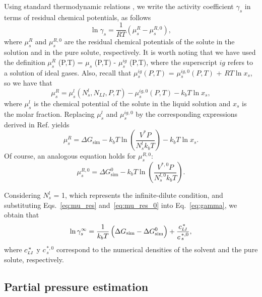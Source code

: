 \documentclass[3p,twocolumn]{elsarticle}
\begin{document}
Using standard thermodynamic relations \cite{Tester}, we write the activity coefficient $\gamma_s$ in terms of residual chemical potentials, as follows
\begin{equation}
\label{eq:gamma}
\ln \gamma_s = \frac{1}{RT} (\mu_s^R - \mu_s^{R,0}),
\end{equation}
where $\mu_s^R$ and $\mu_s^{R,0}$ are the residual chemical potentials of the solute in the solution and in the pure solute, respectively. It is worth noting that we have used the definition $\mu_s^{R}$ (P,T) = $\mu_s$ (P,T) - $\mu_s^{ig}$ (P,T), where the superscript $ig$ refers to a solution of ideal gases. Also, recall that $\mu_s^{ig} (P,T)$ = $\mu_s^{ig,0} (P,T)$ + $RT \ln x_s$, so we have that
\begin{equation}
\mu_s^R = \mu_s^l(N_s^l,N_{LI},P,T) - \mu_s^{ig,0}(P,T) - k_b T \ln x_s, 
\end{equation}
where $\mu_s^l$ is the chemical potential of the solute in the liquid solution and $x_s$ is the molar fraction. Replacing $\mu_s^{l}$ and $\mu_s^{ig,0}$ by the corresponding expressions derived in Ref. \cite{Shirts_2003} yields
\begin{equation}
\label{eq:mu_res}
\mu_s^R = \Delta G_{\text{sim}} - k_b T \ln \left( \frac{V^{\ast} P}{N_s^l k_b T} \right) -  k_b T \ln x_s.
\end{equation}
Of course, an analogous equation holds for $\mu_s^{R,0}$:
\begin{equation}
\label{eq:mu_res_0}
\mu_s^{R,0} = \Delta G_{\text{sim}}^{0} - k_b T \ln \left( \frac{V^{\ast,0} P}{N_s^{l,0} k_b T} \right).
\end{equation}

Considering $N_s^{l}$ = 1, which represents the infinite-dilute condition, and substituting Eqs.~\ref{eq:mu_res} and~\ref{eq:mu_res_0} into Eq.~\ref{eq:gamma}, we  obtain that
\begin{equation}
\label{eq:gamma_inf}
\ln \gamma^{\infty}_s = \frac{1}{k_b T} \left( \Delta G_{\text{sim}} - \Delta G_{\text{sim}}^{0} \right) + \frac{c_{\scaleto{LI}{4pt}}^{\, \ast}}{c_{\, s}^{\, \ast,0}},
\end{equation}
where $c_{\scaleto{LI}{4pt}}^{\, \ast}$ y $c_{\, s}^{\, \ast,0}$ correspond to the numerical densities of the solvent and the pure solute, respectively.

\subsection*{Partial pressure estimation}
\label{sec:partial_pressure}
\end{document}

